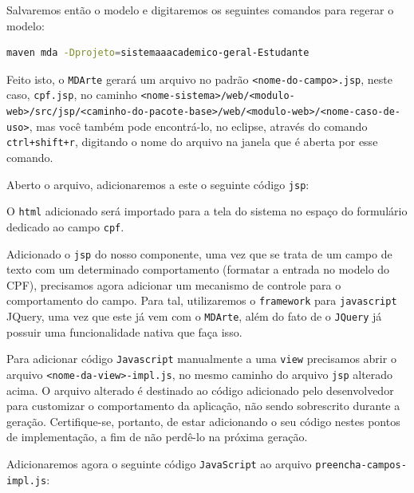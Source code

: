Salvaremos então o modelo e digitaremos os seguintes comandos para regerar o
modelo:
\begin{lstlisting}[language=bash]
maven mda -Dprojeto=sistemaaacademico-geral-Estudante
\end{lstlisting}

Feito isto, o \texttt{MDArte} gerará um arquivo no padrão
\texttt{<nome-do-campo>.jsp}, neste caso, \texttt{cpf.jsp}, no caminho
\texttt{<nome-sistema>/web/<modulo-web>/src/jsp/<caminho-do-pacote-base>/web/<modulo-web>/<nome-caso-de-uso>},
mas você também pode encontrá-lo, no eclipse, através do comando
\texttt{ctrl+shift+r}, digitando o nome do arquivo na janela que é aberta por
esse comando.

Aberto o arquivo, adicionaremos a este o seguinte código \texttt{jsp}:
\begin{framed}

\end{framed}

O \texttt{html} adicionado será importado para a tela do sistema no espaço do
formulário dedicado ao campo \texttt{cpf}.

Adicionado o \texttt{jsp} do nosso componente, uma vez que se trata de um campo
de texto com um determinado comportamento (formatar a entrada no modelo do CPF),
precisamos agora adicionar um mecanismo de controle para o comportamento do
campo. Para tal, utilizaremos o \texttt{framework} para \texttt{javascript}
JQuery, uma vez que este já vem com o \texttt{MDArte}, além do fato de o
\texttt{JQuery} já possuir uma funcionalidade nativa que faça isso.

Para adicionar código \texttt{Javascript} manualmente a uma \texttt{view}
precisamos abrir o arquivo \texttt{<nome-da-view>-impl.js}, no mesmo caminho
do arquivo \texttt{jsp} alterado acima. O arquivo alterado é destinado ao código
adicionado pelo desenvolvedor para customizar o comportamento da aplicação, não
sendo sobrescrito durante a geração. Certifique-se, portanto, de estar
adicionando o seu código nestes pontos de implementação, a fim de não perdê-lo
na próxima geração.

Adicionaremos agora o seguinte código \texttt{JavaScript} ao arquivo
\texttt{preencha-campos-impl.js}:
\begin{framed}

\end{framed}